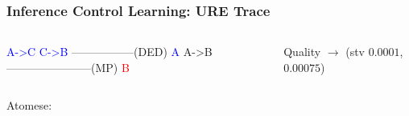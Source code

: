 \documentclass{beamer}
\begin{document}
\begin{frame}[fragile]
  \frametitle{Inference Control Learning: URE Trace}

\begin{columns}
\column{1in}
{\tiny \begin{semiverbatim}
       \textcolor{blue}{A->C   C->B}
       -----------------(DED)
\textcolor{blue}{A}          A->B
-----------------------(MP)
       \textcolor{red}{B}
\end{semiverbatim}}
\column{0.1in}
{\Tiny Quality}
$\rightarrow$
\column{2in}
{\tiny (stv $0.0001$, $0.00075$)}

\end{columns}

{\tiny Atomese:}

\begin{columns}

\column{1in}
  

\end{columns}
\end{frame}
\end{document}
